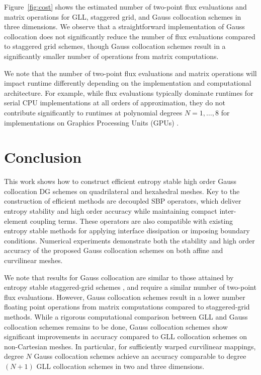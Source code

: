 \documentclass[review,onefignum,onetabnum,final]{siamart171218}
\begin{document}
Figure~\ref{fig:cost} shows the estimated number of two-point flux evaluations and matrix operations for GLL, staggered grid, and Gauss collocation schemes in three dimensions.  We observe that a straightforward implementation of Gauss collocation does not significantly reduce the number of flux evaluations compared to staggered grid schemes, though Gauss collocation schemes result in a  significantly smaller number of operations from matrix computations.  

We note that the number of two-point flux evaluations and matrix operations will impact runtime differently depending on the implementation and computational architecture.  For example, while flux evaluations typically dominate runtimes for serial CPU implementations at all orders of approximation, they do not contribute significantly to runtimes at polynomial degrees $N=1,\ldots, 8$ for implementations on Graphics Processing Units (GPUs) \cite{wintermeyer2018entropy}.  

\section{Conclusion}

This work shows how to construct efficient entropy stable high order Gauss collocation DG schemes on quadrilateral and hexahedral meshes.  Key to the construction of efficient methods are decoupled SBP operators, which deliver entropy stability and high order accuracy while maintaining compact inter-element coupling terms.  These operators are also compatible with existing entropy stable methods for applying interface dissipation \cite{winters2017uniquely} or imposing boundary conditions.  Numerical experiments demonstrate both the stability and high order accuracy of the proposed Gauss collocation schemes on both affine and curvilinear meshes.  

We note that results for Gauss collocation are similar to those attained by entropy stable staggered-grid schemes \cite{parsani2016entropy}, and require a similar number of two-point flux evaluations.  However, Gauss collocation schemes result in a lower number floating point operations from matrix computations compared to staggered-grid methods.  While a rigorous computational comparison between GLL and Gauss collocation schemes remains to be done, Gauss collocation schemes show significant improvements in accuracy compared to GLL collocation schemes on non-Cartesian meshes.  In particular, for sufficiently warped curvilinear mappings, degree $N$ Gauss collocation schemes achieve an accuracy comparable to degree $(N+1)$ GLL collocation schemes in two and three dimensions.  
\end{document}
